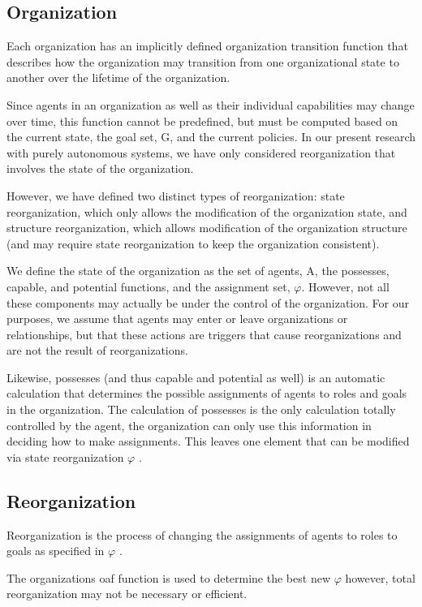 \subsection{Organization}
Each organization has an implicitly defined organization transition function 
that describes how the organization may transition from one organizational state 
to another over the lifetime of the organization\cite{omacs2}.
	
Since agents in an organization as well as their individual capabilities may change over time, 
this function cannot be predefined, but must be computed based on the current state, 
the goal set, G, and the current policies. In our present research with purely autonomous systems, we have only considered reorganization that involves the state of the organization. 

However, we have defined two distinct types of reorganization: state reorganization, which only allows the modification of the organization state, and structure reorganization, which allows modification  of the organization structure (and may require state reorganization to keep the organization consistent).

We define the state of the organization as the set of agents, A, the possesses, capable, and potential functions, and the assignment set, $\varphi$. However, not all these components may actually be under the control of the organization. For our purposes, we assume that agents may enter or leave organizations or relationships, but that these actions are triggers that cause reorganizations and are not the result of reorganizations. 

Likewise, possesses (and thus capable and potential as well) is an automatic calculation that determines the possible assignments of agents to roles and goals in the organization. The calculation of possesses is the only calculation totally controlled by the agent, the organization can only use this information in deciding how to make assignments. This leaves one element that can be modified via state reorganization $\varphi$ \cite{omacs2}.
	
\subsection{Reorganization}
Reorganization is the process of changing the assignments of agents to roles to goals as specified
in $\varphi$ \cite{omacs2}.

The organizations oaf function is used to determine the best new $\varphi$  however, total
reorganization may not be necessary or efficient.


